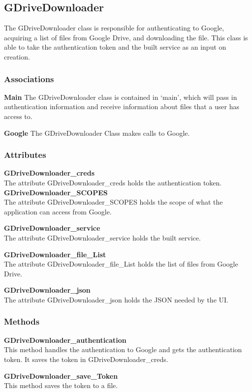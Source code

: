 \subsection{GDriveDownloader}
The GDriveDownloader class is responsible for authenticating to Google, acquiring a list of files from Google Drive, and downloading the file.
This class is able to take the authentication token and the built service as an input on creation.  
\subsubsection{Associations}
\textbf{Main} 
The GDriveDownloader class is contained in `main', which will pass in authentication information and receive information about files 
that a user has access to.

\textbf{Google} 
The GDriveDownloader Class makes calls to Google.

\subsubsection{Attributes}
\textbf{GDriveDownloader\_creds} \\
The attribute GDriveDownloader\_creds holds the authentication token.
\textbf{GDriveDownloader\_SCOPES} \\
The attribute GDriveDownloader\_SCOPES holds the scope of what the application can access from Google.

\textbf{GDriveDownloader\_service} \\
The attribute GDriveDownloader\_service holds the built service.

\textbf{GDriveDownloader\_file\_List} \\
The attribute GDriveDownloader\_file\_List holds the list of files from Google Drive.

\textbf{GDriveDownloader\_json} \\
The attribute GDriveDownloader\_json holds the JSON needed by the UI. 
\subsubsection{Methods}
\textbf{GDriveDownloader\_authentication} \\
This method handles the authentication to Google and gets the authentication token. It saves the token in GDriveDownloader\_creds.

\textbf{GDriveDownloader\_save\_Token} \\
This method saves the token to a file.

